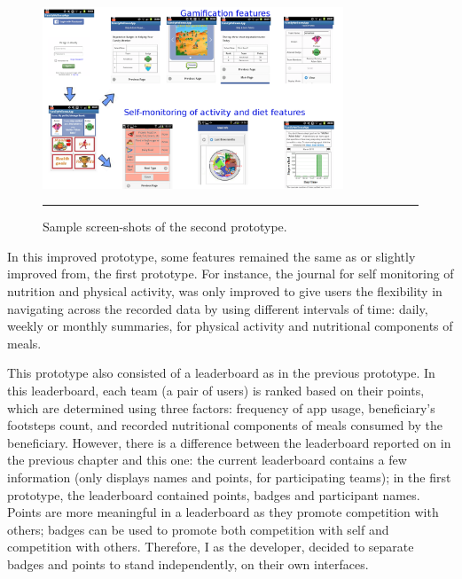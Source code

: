 \begin{figure}[htbp]
  \centering
    \includegraphics[width=0.8\textwidth]{Figures/Version2/Prototype2Screenshots.png}
    \rule{35em}{0.5pt}
  \caption{Sample screen-shots of the second prototype.}
  \label{figure:prototype_2_screens}
\end{figure}

In this improved prototype, some features remained the same as or slightly improved from, the first prototype. For instance, the journal for
self monitoring of nutrition and physical activity, was only improved to give users the flexibility in navigating across the recorded data by using different intervals of time: daily, weekly or monthly summaries, for physical activity and nutritional components of meals.

This prototype also consisted of a leaderboard as in the previous prototype. In this leaderboard, each team (a pair of users) is ranked based on their points, which are determined using three factors: frequency of app usage, beneficiary's footsteps count, and recorded nutritional components of meals consumed by the beneficiary. However, there is a difference between the leaderboard reported on in the previous chapter and this one: the current leaderboard contains a few information (only displays names and points, for participating teams); in the first prototype, the leaderboard contained points, badges and participant names. Points are more meaningful in a leaderboard as they promote competition with others; badges can be used to promote both competition with self and competition with others. Therefore, I as the developer, decided to separate badges and points to stand independently, on their own interfaces.  

